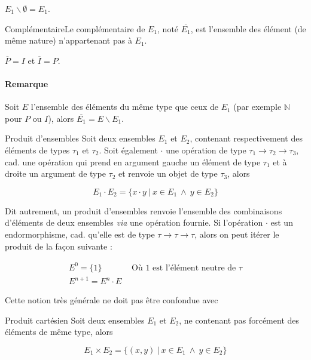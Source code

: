 \begin{example}
$E_1 \backslash \emptyset = E_1$.
\end{example}

\begin{definition}{Complémentaire}{}Le complémentaire de $E_1$, noté $\overline{E_1}$, est l'ensemble des élément (de même nature) n'appartenant pas à $E_1$.
\end{definition}

\begin{example}
$\overline{P} = I$ et $\overline{I} = P$.
\end{example}

\paragraph*{Remarque} Soit $E$ l'ensemble des éléments du même type que ceux de $E_1$ (par exemple $\mathbb{N}$ pour $P$ ou $I$), alors $\overline{E_1} = E \backslash E_1$.

\begin{definition}{Produit d'ensembles}{}
\label{ensprod}
Soit deux ensembles $E_1$ et $E_2$, contenant respectivement des éléments de types $\tau_1$ et $\tau_2$. Soit également $\cdot$ une opération de type $\tau_1 \rightarrow \tau_2 \rightarrow \tau_3$, cad. une opération qui prend en argument gauche un élément de type $\tau_1$ et à droite un argument de type $\tau_2$ et renvoie un objet de type $\tau_3$, alors 

\[
E_1 \cdot E_2 = \{x \cdot y~|~x \in E_1~\wedge~y \in E_2\}
\]
\end{definition}

Dit autrement, un produit d'ensembles renvoie l'ensemble des combinaisons d'éléments de deux ensembles \textit{via} une opération fournie. Si l'opération $\cdot$ est un endormorphisme, cad. qu'elle est de type $\tau \rightarrow \tau \rightarrow \tau$, alors on peut itérer le produit de la façon suivante :

\begin{eqnarray*}
E^0 = \{1\} ~~~~~~~~~~~~~~~~ \textrm{Où $1$ est l'élément neutre de $\tau$} \\
E^{n+1} = E^n \cdot E
\end{eqnarray*}

Cette notion très générale ne doit pas être confondue avec

\begin{definition}{Produit cartésien}{}
Soit deux ensembles $E_1$ et $E_2$, ne contenant pas forcément des éléments de même type, alors

\[
E_1 \times E_2 = \{(x,y)~|~x \in E_1~\wedge~y \in E_2\}
\]
\end{definition}

